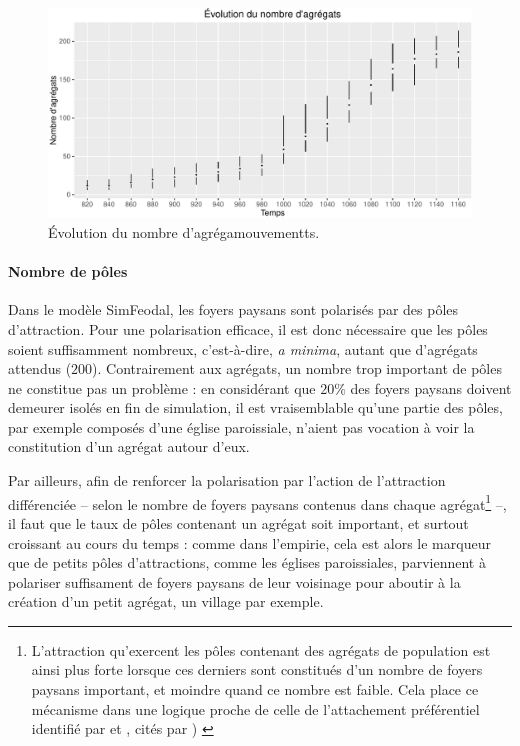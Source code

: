 \begin{figure}[H]
	\captionsetup{width=\linewidth}
	\includegraphics[width=\linewidth]{img/resultats/v0_nombre_agregats.pdf}
	\caption{Évolution du nombre d'agrégamouvementts.} 
	\label{fig:nombre-agregats-v0} 
\end{figure}


\paragraph{Nombre de pôles}\label{para:nb-poles}

Dans le modèle SimFeodal, les foyers paysans sont polarisés par des pôles d'attraction.
Pour une polarisation efficace, il est donc nécessaire que les pôles soient suffisamment nombreux, c'est-à-dire, \textit{a minima}, autant que d'agrégats attendus ($200$).
Contrairement aux agrégats, un nombre trop important de pôles ne constitue pas un problème :
en considérant que $20\%$ des foyers paysans doivent demeurer isolés en fin de simulation, il est vraisemblable qu'une partie des pôles, par exemple composés d'une église paroissiale, n'aient pas vocation à voir la constitution d'un agrégat autour d'eux.

Par ailleurs, afin de renforcer la polarisation par l'action de l'attraction différenciée -- selon le nombre de foyers paysans contenus dans chaque agrégat\footnote{\label{ftn:preferential-attachment}
	L'attraction qu'exercent les pôles contenant des agrégats de population est ainsi plus forte lorsque ces derniers sont constitués d'un nombre de foyers paysans important, et moindre quand ce nombre est faible.
Cela place ce mécanisme dans une logique proche de celle de l'attachement préférentiel identifié par \autocite{yule1925ii} et  \autocite{simon1955class}, cités par \autocite[93]{schmitt_modelisation_2014-1}) \label{ftn:attachement-preferentiel}
} --, il faut que le taux de pôles contenant un agrégat soit important, et surtout croissant au cours du temps :
comme dans l'empirie, cela est alors le marqueur que de petits pôles d'attractions, comme les églises paroissiales, parviennent à polariser suffisament de foyers paysans de leur voisinage pour aboutir à la création d'un petit agrégat, un village par exemple.

